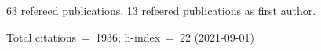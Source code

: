 63 refereed publications. 13 refeered publications as first author.

Total citations~=~1936; h-index~=~22 (2021-09-01)